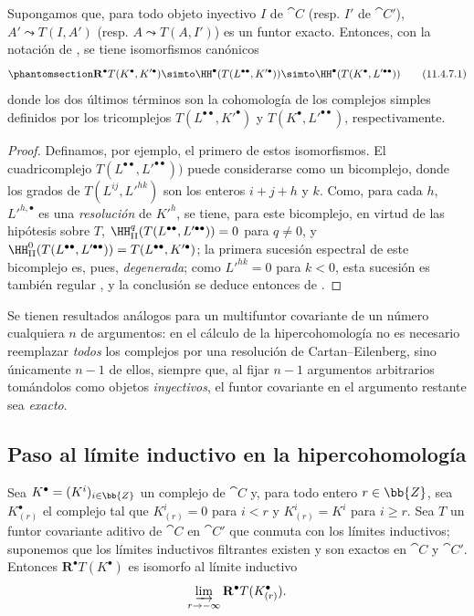 \documentclass[oneside]{amsart}
\makeatletter
\renewcommand{\geq}{\geqslant}
\newcommand{\ega@arrow}[2]{\mathchoice{#1}{#2}{#2}{#2}}
\renewcommand{\to}{\ega@arrow{\longrightarrow}{\rightarrow}}
\newcommand{\oldpage}[2][]{{\marginnote{\normalfont\textbf{#1}~|~#2}}\ignorespaces}
\let\EGAOriginalLabel\label
\renewcommand{\label}[1]{\phantomsection\EGAOriginalLabel{#1}}
\makeatother
\begin{document}
\begin{proposition}[11.4.7]
\label{0.11.4.7}
Supongamos que, para todo objeto inyectivo $I$ de $\cat{C}$ \textup{(resp.} $I'$ de $\cat{C}'$), $A'\leadsto T(I, A')$ \textup{(resp.} $A\leadsto T(A, I')$) es un funtor exacto.
Entonces, con la notación de , se tiene isomorfismos canónicos
\[
  \label{0.11.4.7.1} \mathbf{R}^\bullet T(K^\bullet, K'^\bullet) \simto \HH^\bullet(T(L^{\bullet\bullet}, K'^\bullet)) \simto \HH^\bullet(T(K^\bullet, L'^{\bullet\bullet})) \tag{11.4.7.1} 
\]
donde los dos últimos términos son la cohomología de los complejos simples definidos por los tricomplejos $T(L^{\bullet\bullet}, K'^\bullet)$ y $T(K^\bullet, L'^{\bullet\bullet})$, respectivamente.
\end{proposition}

\begin{proof}
Definamos, por ejemplo, el primero de estos isomorfismos.
El cuadricomplejo $T(L^{\bullet\bullet}, L'^{\bullet\bullet}))$ puede considerarse como un bicomplejo, donde los grados de $T(L^{ij}, L'^{hk})$ son los enteros $i+j+h$ y $k$.
Como, para cada $h$, ${L'}^{h,\bullet}$ es una \emph{resolución} de ${K'}^h$, se tiene, para este bicomplejo, en virtud de las hipótesis sobre $T$, $\HH_\mathrm{II}^q(T(L^{\bullet\bullet}, L'^{\bullet\bullet}))=0$ para $q\neq 0$, y $\HH_\mathrm{II}^0(T(L^{\bullet\bullet}, L'^{\bullet\bullet})) = T(L^{\bullet\bullet}, K'^\bullet)$;
la primera sucesión espectral de este bicomplejo es, pues, \emph{degenerada};
como $L'^{hk}=0$ para $k<0$, esta sucesión es también regular , y la conclusión se deduce entonces de .
\end{proof}

Se tienen resultados análogos para un multifuntor covariante de un número cualquiera $n$ de argumentos: en el cálculo de la hipercohomología no es necesario reemplazar \emph{todos} los complejos
por una resolución de Cartan--Eilenberg, sino únicamente $n-1$ de ellos, siempre que, al fijar $n-1$ argumentos arbitrarios tomándolos como objetos \emph{inyectivos}, el funtor covariante en el argumento restante sea \emph{exacto}.


\subsection{Paso al límite inductivo en la hipercohomología}
\label{subsection:0.11.5}

\begin{lemma}[11.5.1]
\label{0.11.5.1}
Sea $K^\bullet=(K^i)_{i\in\bb{Z}}$ un complejo de $\cat{C}$ y, para todo entero $r\in\bb{Z}$, sea $K^\bullet_{(r)}$ el complejo tal que $K^i_{(r)}=0$ para $i<r$ y $K^i_{(r)}=K^i$ para $i\geq r$.
Sea $T$ un funtor covariante aditivo
\oldpage[0\textsubscript{III}]{36}
de $\cat{C}$ en $\cat{C}'$ que conmuta con los límites inductivos; suponemos que los límites inductivos filtrantes existen y son exactos en $\cat{C}$ y $\cat{C}'$.
Entonces $\mathbf{R}^\bullet T(K^\bullet)$ es isomorfo al límite inductivo
\[
  \varinjlim_{r\to-\infty}\mathbf{R}^\bullet T(K^\bullet_{(r)}).
\]
\end{lemma}
\end{document}
